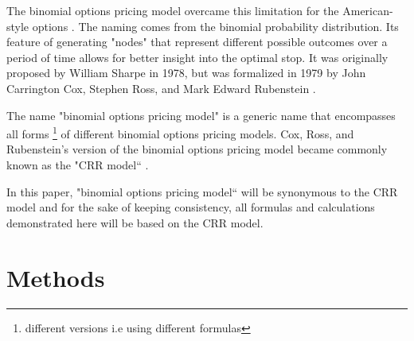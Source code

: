 \documentclass[12pt, letterpaper]{article}
\begin{document}
The binomial options pricing model overcame this limitation for the American-style options \cite{bopmwikipedia}.
The naming comes from the binomial probability distribution.
Its feature of generating "nodes" that represent different possible outcomes over a period of time allows for better insight into the optimal stop.
It was originally proposed by William Sharpe in 1978, but was formalized in 1979 by John Carrington Cox, Stephen Ross, and Mark Edward Rubenstein \cite{bopmwikipedia}.

The name "binomial options pricing model" is a generic name that encompasses all forms \footnote{different versions i.e using different formulas} of different binomial options pricing models.
Cox, Ross, and Rubenstein's version of the binomial options pricing model became commonly known as the "CRR model`` \cite{thebinomialmodelcornell}.

In this paper, "binomial options pricing model`` will be synonymous to the CRR model and for the sake of keeping consistency, all formulas and calculations demonstrated here will be based on the CRR model.

\pagebreak

\section*{Methods}
\end{document}
